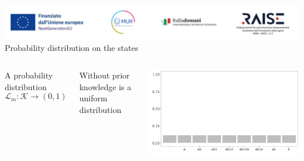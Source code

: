 \documentclass{beamer}
\begin{document}
\begin{frame}{\includegraphics[scale=0.4]{Da_cambiare.png} \\ Probability distribution on the states}{} 
  \begin{columns}
 \footnotesize
A probability distribution 
\[\mathcal{L}_{m}: \mathcal{K} \rightarrow (0,1)\]

Without prior knowledge is a uniform distribution
\vspace{.5 cm}

  \includegraphics[scale=0.2]{Verosimiglianza.png}
   

\end{columns}
\end{frame}
\end{document}
